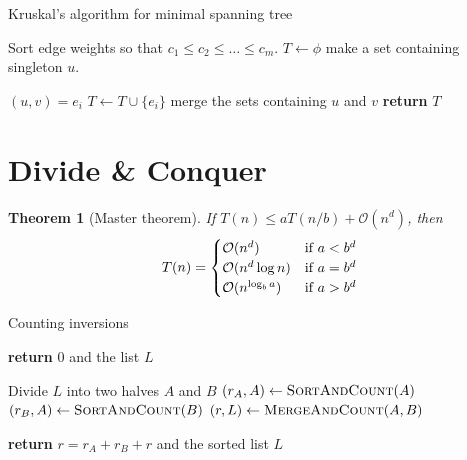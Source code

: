 \documentclass[10pt, oneside, reqno]{amsart}
\theoremstyle{plain}%
\newtheorem{thm}{Theorem}[section]
\theoremstyle{definition}
\theoremstyle{remark}
\newcommand{\bigo}[1]{\mathcal{O}(#1)}
\begin{document}
\begin{algorithm}[H]
    \label{alg:dynamic_rising_trend}
    \caption{Kruskal's algorithm for minimal spanning tree}
    \begin{algorithmic}[1]
            \State Sort edge weights so that $c_1 \leq c_2 \leq \dots \leq c_m$.
            \State $T \gets \phi$
             make a set containing singleton $u$.
            \EndFor
            
                \State $(u,v) = e_i$
                    \State $T \gets T \cup \{e_i \}$
                    \State merge the sets containing $u$ and $v$
                \EndIf
            \EndFor
            \State \textbf{return} $T$
        \EndProcedure
    \end{algorithmic}
\end{algorithm}





\section{Divide \& Conquer} %
\label{sec:divide_&_conquer}

\begin{thm}[Master theorem]
    If $T(n) \leq a T(n/b) + \bigo{n^d}$, then \[
        T(n) = \begin{cases}
            \bigo{n^d} & \text{if $a < b^d$}\\
            \bigo{n^d \log n} &\text{if $a = b^d$}\\
            \bigo{n^{\log_b a}} & \text{if $ a  > b^d$}
        \end{cases}
    \]
\end{thm}
\begin{algorithm}[H]
    \label{alg:dynamic_rising_trend}
    \caption{Counting inversions}
    \begin{algorithmic}[1]
                \State \textbf{return} 0 and the list $L$
            \EndIf
            
            \State Divide $L$ into two halves $A$ and $B$
            \State $(r_A, A) \gets \textsc{SortAndCount}(A)$
            \State $(r_B, A) \gets \textsc{SortAndCount}(B)$
            \State $(r, L) \gets \textsc{MergeAndCount}(A,B)$
            
            \State
            \State \textbf{return} $r = r_A + r_B + r$ and the sorted list $L$
    \EndProcedure
    \end{algorithmic}
\end{algorithm}
\end{document}
